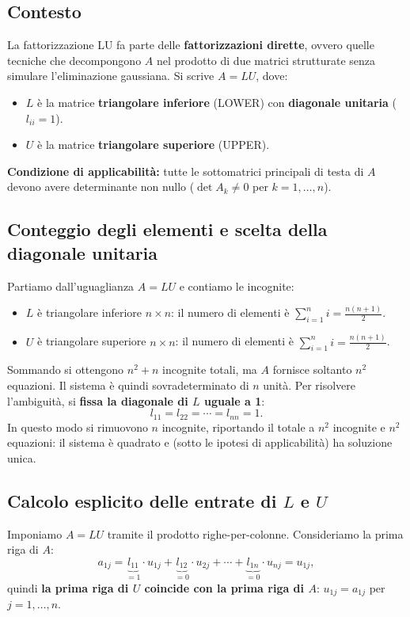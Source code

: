 \documentclass[a4paper,12pt]{article}
\theoremstyle{definition}
\theoremstyle{remark}
\begin{document}
\subsection{Contesto}

La fattorizzazione LU fa parte delle \textbf{fattorizzazioni dirette}, ovvero quelle
tecniche che decompongono $A$ nel prodotto di due matrici strutturate senza simulare
l'eliminazione gaussiana. Si scrive $A = LU$, dove:
\begin{itemize}
  \item $L$ è la matrice \textbf{triangolare inferiore} (LOWER) con \textbf{diagonale
        unitaria} ($l_{ii} = 1$).
  \item $U$ è la matrice \textbf{triangolare superiore} (UPPER).
\end{itemize}
\textbf{Condizione di applicabilità:} tutte le sottomatrici principali di testa di $A$
devono avere determinante non nullo ($\det A_k \neq 0$ per $k = 1, \ldots, n$).

\subsection{Conteggio degli elementi e scelta della diagonale unitaria}

Partiamo dall'uguaglianza $A = LU$ e contiamo le incognite:
\begin{itemize}
  \item $L$ è triangolare inferiore $n \times n$: il numero di elementi è
        $\displaystyle\sum_{i=1}^{n} i = \frac{n(n+1)}{2}$.
  \item $U$ è triangolare superiore $n \times n$: il numero di elementi è
        $\displaystyle\sum_{i=1}^{n} i = \frac{n(n+1)}{2}$.
\end{itemize}
Sommando si ottengono $n^2 + n$ incognite totali, ma $A$ fornisce soltanto $n^2$
equazioni. Il sistema è quindi sovradeterminato di $n$ unità. Per risolvere
l'ambiguità, si \textbf{fissa la diagonale di $L$ uguale a 1}:
\[
  l_{11} = l_{22} = \cdots = l_{nn} = 1.
\]
In questo modo si rimuovono $n$ incognite, riportando il totale a $n^2$ incognite
e $n^2$ equazioni: il sistema è quadrato e (sotto le ipotesi di applicabilità)
ha soluzione unica.

\subsection{Calcolo esplicito delle entrate di $L$ e $U$}

Imponiamo $A = LU$ tramite il prodotto righe-per-colonne. Consideriamo la prima
riga di $A$:
\[
  a_{1j}
    = \underbrace{l_{11}}_{=1}\cdot u_{1j}
      + \underbrace{l_{12}}_{=0}\cdot u_{2j}
      + \cdots
      + \underbrace{l_{1n}}_{=0}\cdot u_{nj}
    = u_{1j},
\]
quindi \textbf{la prima riga di $U$ coincide con la prima riga di $A$}:
$u_{1j} = a_{1j}$ per $j = 1, \ldots, n$.
\end{document}
